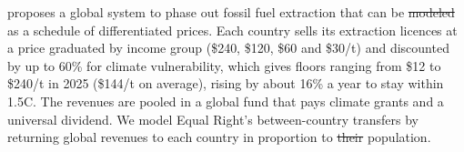 \documentclass[12pt,english]{article}
\theoremstyle{remark}
\providecommand{\DIFaddtex}[1]{{\protect\color{blue}\uwave{#1}}} %
\providecommand{\DIFdeltex}[1]{{\protect\color{red}\sout{#1}}}                      %
\providecommand{\DIFaddbegin}{} %
\providecommand{\DIFaddend}{} %
\providecommand{\DIFdelbegin}{} %
\providecommand{\DIFdelend}{} %
\providecommand{\DIFadd}[1]{\texorpdfstring{\DIFaddtex{#1}}{#1}} %
\providecommand{\DIFdel}[1]{\texorpdfstring{\DIFdeltex{#1}}{}} %
\newcommand{\DIFscaledelfig}{0.5}
\newlength{\DIFdelgraphicswidth} %
\newlength{\DIFdelgraphicsheight} %
\newcommand{\DIFaddincludegraphics}[2][]{{\color{blue}\fbox{\DIFOincludegraphics[#1]{#2}}}} %
\newcommand{\DIFdelincludegraphics}[2][]{%
\sbox{\DIFdelgraphicsbox}{\DIFOincludegraphics[#1]{#2}}%
\settoboxwidth{\DIFdelgraphicswidth}{\DIFdelgraphicsbox} %
\settoboxtotalheight{\DIFdelgraphicsheight}{\DIFdelgraphicsbox} %
\scalebox{\DIFscaledelfig}{%
\parbox[b]{\DIFdelgraphicswidth}{\usebox{\DIFdelgraphicsbox}\\[-\baselineskip] \rule{\DIFdelgraphicswidth}{0em}}\llap{\resizebox{\DIFdelgraphicswidth}{\DIFdelgraphicsheight}{%
\setlength{\unitlength}{\DIFdelgraphicswidth}%
\begin{picture}(1,1)%
\thicklines\linethickness{2pt} %
{\color[rgb]{1,0,0}\put(0,0){\framebox(1,1){}}}%
{\color[rgb]{1,0,0}\put(0,0){\line( 1,1){1}}}%
{\color[rgb]{1,0,0}\put(0,1){\line(1,-1){1}}}%
\end{picture}%
}\hspace*{3pt}}} %
} %
\DeclareRobustCommand{\DIFaddbegin}{\DIFOaddbegin \let\includegraphics\DIFaddincludegraphics} %
\DeclareRobustCommand{\DIFaddend}{\DIFOaddend \let\includegraphics\DIFOincludegraphics} %
\DeclareRobustCommand{\DIFdelbegin}{\DIFOdelbegin \let\includegraphics\DIFdelincludegraphics} %
\DeclareRobustCommand{\DIFdelend}{\DIFOaddend \let\includegraphics\DIFOincludegraphics} %
\begin{document}
\citet{equal_right_climate_2023} proposes a global system to phase out fossil fuel extraction that can be \DIFdelbegin \DIFdel{modeled }\DIFdelend \DIFaddbegin \DIFadd{modelled }\DIFaddend as a schedule of differentiated prices.  
Each country sells its extraction licences at a price graduated by income group (\$240, \$120, \$60 and \$30/t) and discounted by up to 60\% for climate vulnerability, which gives floors ranging from \$12 to \$240/t in 2025 (\$144/t on average), rising by about 16\% a year to stay within 1.5\textdegree C. 
The revenues are pooled in a global fund that pays climate grants and a universal dividend. We model Equal Right's between-country transfers by returning global revenues to each country in proportion to \DIFdelbegin \DIFdel{their }\DIFdelend \DIFaddbegin \DIFadd{its }\DIFaddend population. 
\end{document}
